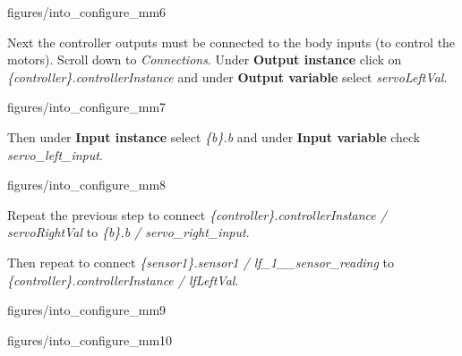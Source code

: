 \documentclass[11pt,a4paper]{../tutorial}
\begin{document}
\begin{instructions}
    \begin{annotation}[width=0.8\linewidth]{figures/into_configure_mm6}
    \end{annotation}

\item Next the controller outputs must be connected to the body inputs (to control the motors). Scroll down to \emph{Connections}. Under \textbf{Output instance} click on \emph{\{controller\}.controllerInstance} and under \textbf{Output variable} select \emph{servoLeftVal}.

    \begin{annotation}[width=0.8\linewidth,trim=0 0 0 100,clip]{figures/into_configure_mm7}
    \end{annotation}

\item Then under \textbf{Input instance} select \emph{\{b\}.b} and under \textbf{Input variable} check \emph{servo\_left\_input}.

    \begin{annotation}[width=0.8\linewidth,trim=0 70 0 0,clip]{figures/into_configure_mm8}
    \end{annotation}

\item Repeat the previous step to connect  \emph{\{controller\}.controllerInstance / servoRightVal} to \emph{\{b\}.b / servo\_right\_input}.

\item Then repeat to connect \emph{\{sensor1\}.sensor1 / lf\_1\_\_sensor\_reading} to \emph{\{controller\}.controllerInstance / lfLeftVal}.

    \begin{annotation}[width=0.8\linewidth,trim=0 165 0 0,clip]{figures/into_configure_mm9}
    \end{annotation}

    \begin{annotation}[width=0.8\linewidth,trim=0 0 0 126,clip]{figures/into_configure_mm10}
    \end{annotation}


\end{instructions}
\end{document}
